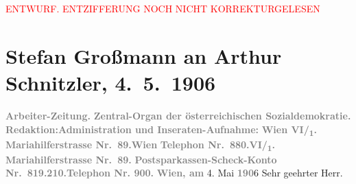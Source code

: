 
\begin{center}
            \textcolor{red}{ENTWURF. ENTZIFFERUNG NOCH NICHT KORREKTURGELESEN}
                      \end{center}
            
               \section[Stefan Großmann an Arthur Schnitzler, 4. 5. 1906]{ Stefan Großmann an Arthur Schnitzler, 4. 5. 1906}\nopagebreak{}\rehead{ }\begin{ledgroupsized}[t]{13cm}\normalsize\beginnumbering{} \toendnotes[C]{\smallbreak\pagebreak[2]} 
\pstart
           \noindent{}\centering{}{\pb}\textcolor{gray}{\textbf{Arbeiter-Zeitung.}}\pend
           \pstart
           \noindent{}\centering{}\textcolor{gray}{\textbf{Zentral-Organ der österreichischen Sozialdemokratie.}}\pend
           \pstart
           \noindent{}\textcolor{gray}{\textbf{Redaktion:}}\hfill \textcolor{gray}{\textbf{Administration und Inseraten-Aufnahme:}}\pend
           \pstart
           \textcolor{gray}{\textbf{Wien VI/\textsubscript{1}. Mariahilferstrasse Nr. 89.}}\hfill \textcolor{gray}{\textbf{Wien}}\pend
           \pstart
           \textcolor{gray}{\textbf{Telephon Nr. 880.}}\hfill \textcolor{gray}{\textbf{VI/\textsubscript{1}. Mariahilferstrasse
                           Nr. 89.}}\pend
           \pstart
           \textcolor{gray}{\textbf{Postsparkassen-Scheck-Konto Nr. 819.210.}}\hfill \textcolor{gray}{\textbf{Telephon Nr. 900.}}\pend
           \pstart
           \raggedleft{}\textcolor{gray}{\textbf{Wien, am}}{ }4. Mai \textcolor{gray}{\textbf{190}}6\pend
           \pstart{}Sehr geehrter Herr.\pend\pstart

\end{ledgroupsized}
